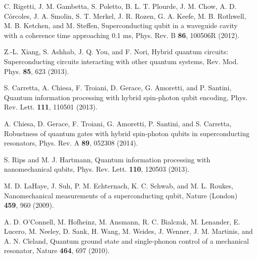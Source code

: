 \documentclass[aps,twocolumn,groupedaddress,superscriptaddress,floatfix,amsmath,amssymb,prb]{revtex4-1}
\begin{document}
\begin{thebibliography}{99}
C. Rigetti, J. M. Gambetta, S. Poletto, B. L. T. Plourde, J. M. Chow, A. D. C\'{o}rcoles, J. A. Smolin, S. T. Merkel, J. R. Rozen, G. A. Keefe, M. B. Rothwell, M. B. Ketchen, and M. Steffen,
{Superconducting qubit in a waveguide cavity with a coherence time approaching 0.1 ms}, 
Phys. Rev. B {\bf 86}, 100506R (2012).

Z.-L. Xiang, S. Ashhab, J. Q. You, and F. Nori,
{Hybrid quantum circuits: Superconducting circuits interacting with other quantum systems},  
Rev. Mod. Phys. {\bf 85}, 623 (2013).

S. Carretta, A. Chiesa, F. Troiani, D. Gerace, G. Amoretti, and P. Santini, 
{Quantum information processing with hybrid spin-photon qubit encoding}, 
Phys. Rev. Lett. \textbf{111}, 110501 (2013).

A. Chiesa, D. Gerace, F. Troiani, G. Amoretti, P. Santini, and S. Carretta, 
{Robustness of quantum gates with hybrid spin-photon qubits in superconducting resonators}, 
Phys. Rev. A \textbf{89}, 052308 (2014).

S. Rips and M. J. Hartmann, 
{Quantum information processing with nanomechanical qubits}, 
Phys. Rev. Lett. \textbf{110}, 120503 (2013).


M. D. LaHaye, J. Suh, P. M. Echternach, K. C. Schwab, and M. L. Roukes, 
{Nanomechanical measurements of a superconducting qubit}, 
Nature (London) \textbf{459}, 960 (2009).

A. D. O'Connell, M. Hofheinz, M. Ansmann, R. C. Bialczak, M. Lenander, E. Lucero, M. Neeley, D. Sank, H. Wang, M. Weides, J. Wenner, J. M. Martinis, and A. N. Cleland,
Quantum ground state and single-phonon control of a mechanical resonator,
Nature {\bf 464}, 697 (2010).


\end{thebibliography}
\end{document}
